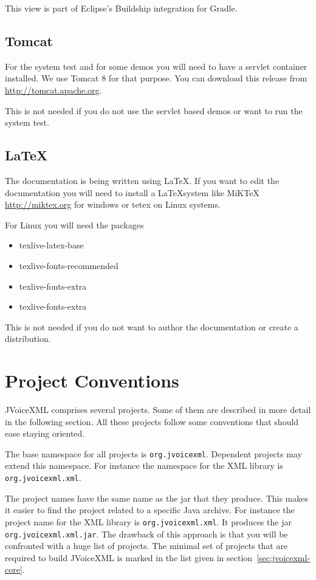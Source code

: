 \documentclass[11pt,a4paper]{article}
\begin{document}
This view is part of Eclipse's Buildship integration for Gradle.

\subsection{Tomcat}
\label{sec:tomcat}

For the system test and for some demos you will need to have a servlet
container installed. We use Tomcat 8 for that purpose. You can download this
release from \url{http://tomcat.apache.org}.

This is not needed if you do not use the servlet based demos or want to run the
system test.

\subsection{\LaTeX}

The documentation is being written using \LaTeX. If you want to edit the
documentation you will need to install a \LaTeX system like MiKTeX
\url{http://miktex.org} for windows or tetex on Linux systems.

For Linux you will need the packages
\begin{itemize}
  \item texlive-latex-base
  \item texlive-fonts-recommended
  \item texlive-fonts-extra
  \item texlive-fonts-extra
\end{itemize}
This is not needed if you do not want to author the documentation or create a
distribution.

\section{Project Conventions}

JVoiceXML comprises several projects. Some of them are described in more
detail in the following section. All these projects follow some conventions
that should ease staying oriented.

The base namespace for all projects is \lstinline{org.jvoicexml}. Dependent 
projects may extend this namespace. For instance the namespace for the
XML library is \lstinline{org.jvoicexml.xml}.

The project names have the same name as the jar that they produce. This
makes it easier to find the project related to a specific Java archive.
For instance the project name for the XML library is
\lstinline{org.jvoicexml.xml}. It produces the jar
\texttt{org.jvoicexml.xml.jar}.
The drawback of this approach is that you will be confronted 
with a huge list of projects. The minimal set of projects
that are required to build JVoiceXML is marked in the list
given in section~\ref{sec:jvoicexml-core}.
\end{document}

